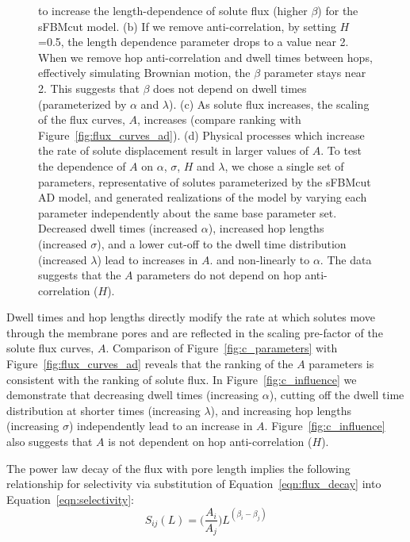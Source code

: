 \documentclass[journal=jctcce,manuscript=article]{achemso}
\begin{document}
\begin{figure}
{	  to increase the length-dependence of solute flux (higher $\beta$) for
	  the sFBMcut model.  (b) If we remove anti-correlation, by setting
	  $H$=0.5, the length dependence parameter drops to a value near 2.
	  When we remove hop anti-correlation and dwell times between hops,
	  effectively simulating Brownian motion, the $\beta$ parameter stays
	  near 2.  This suggests that $\beta$ does not depend on dwell times
	  (parameterized by $\alpha$ and $\lambda$). (c) As solute flux
	  increases, the scaling of the flux curves, $A$, increases (compare
	  ranking with Figure~\ref{fig:flux_curves_ad}).  (d) Physical
	  processes which increase the rate of solute displacement result in
	  larger values of $A$. To test the dependence of $A$ on $\alpha$,
	  $\sigma$, $H$ and $\lambda$, we chose a single set of parameters,
	  representative of solutes parameterized by the sFBMcut AD model, and
	  generated realizations of the model by varying each parameter
	  independently about the same base parameter set. 
	  Decreased dwell times (increased $\alpha$), increased hop lengths (increased
	  $\sigma$), and a lower cut-off to the dwell time distribution
	  (increased $\lambda$) lead to increases in $A$. 
	  and non-linearly to $\alpha$.  The data suggests that the $A$
	  parameters do not depend on hop anti-correlation ($H$).
 	  }\label{fig:beta}
  \end{figure}
    
  Dwell times and hop lengths directly modify the rate at which solutes move 
  through the membrane pores and are reflected in the scaling pre-factor of
  the solute flux curves, $A$. Comparison of Figure~\ref{fig:c_parameters} with 
  Figure~\ref{fig:flux_curves_ad} reveals that the ranking of the $A$ parameters
  is consistent with the ranking of solute flux. In Figure~\ref{fig:c_influence} we
  demonstrate that decreasing dwell times (increasing $\alpha$), cutting off 
  the dwell time distribution at shorter times (increasing $\lambda$), and increasing 
  hop lengths (increasing $\sigma$) independently lead to an increase in $A$. 
  Figure~\ref{fig:c_influence} also suggests that $A$ is not dependent on hop 
  anti-correlation ($H$).
  
  The power law decay of the flux with pore length implies the following
  relationship for selectivity via substitution of
  Equation~\ref{eqn:flux_decay} into Equation~\ref{eqn:selectivity}:
  \begin{equation}
  S_{ij}(L) = \bigg(\frac{A_i}{A_j}\bigg)L^{(\beta_i - \beta_j)}
  \label{eqn:selectivity_ratio}
  \end{equation}
\end{document}
